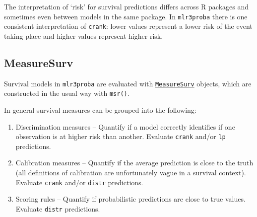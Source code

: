 \begin{tcolorbox}[enhanced jigsaw, opacitybacktitle=0.6, rightrule=.15mm, opacityback=0, arc=.35mm, breakable, titlerule=0mm, colframe=quarto-callout-warning-color-frame, coltitle=black, bottomrule=.15mm, toprule=.15mm, colback=white, colbacktitle=quarto-callout-warning-color!10!white, bottomtitle=1mm, toptitle=1mm, title=\textcolor{quarto-callout-warning-color}{\faExclamationTriangle}\hspace{0.5em}{Interpreting Survival Risk}, leftrule=.75mm, left=2mm]

The interpretation of `risk' for survival predictions differs across R
packages and sometimes even between models in the same package. In
\texttt{mlr3proba} there is one consistent interpretation of
\texttt{crank}: lower values represent a lower risk of the event taking
place and higher values represent higher risk.

\end{tcolorbox}

\hypertarget{measuresurv}{%
\subsection{MeasureSurv}\label{measuresurv}}

Survival models in \texttt{mlr3proba} are evaluated with
\href{https://mlr3proba.mlr-org.com/reference/MeasureSurv.html}{\texttt{MeasureSurv}}
objects, which are constructed in the usual way with \texttt{msr()}.

In general survival measures can be grouped into the following:

\begin{enumerate}
\def\labelenumi{\arabic{enumi}.}
\tightlist
\item
  Discrimination measures -- Quantify if a model correctly identifies if
  one observation is at higher risk than another. Evaluate
  \texttt{crank} and/or \texttt{lp} predictions.
\item
  Calibration measures -- Quantify if the average prediction is close to
  the truth (all definitions of calibration are unfortunately vague in a
  survival context). Evaluate \texttt{crank} and/or \texttt{distr}
  predictions.
\item
  Scoring rules -- Quantify if probabilistic predictions are close to
  true values. Evaluate \texttt{distr} predictions.
\end{enumerate}

\begin{Shaded}
\begin{Highlighting}[]
\NormalTok{(mlr\_measures)[}
\SpecialCharTok{==} \NormalTok{, }\NormalTok{(}\NormalTok{, }\NormalTok{)][}\SpecialCharTok{:}\NormalTok{]}
\end{Highlighting}
\end{Shaded}

